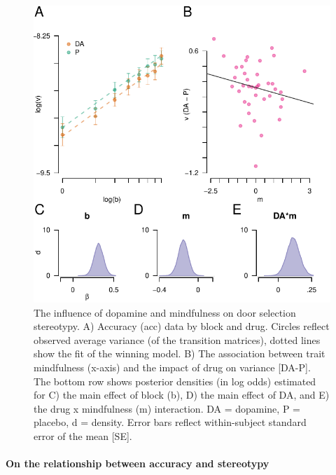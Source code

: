 \documentclass{article}
\begin{document}
\begin{figure}

{\centering \includegraphics[width=0.7\linewidth]{../../images/s_fig} 

}

\caption{The influence of dopamine and mindfulness on door selection stereotypy. A) Accuracy (acc) data by block and drug. Circles reflect observed average variance (of the transition matrices), dotted lines show the fit of the winning model. B) The association between trait mindfulness (x-axis) and the impact of drug on variance [DA-P]. The bottom row shows posterior densities (in log odds) estimated for C) the main effect of block (b), D) the main effect of DA, and E) the drug x mindfulness (m) interaction. DA = dopamine, P = placebo, d = density. Error bars reflect within-subject standard error of the mean [SE].}\label{fig:stereofig}
\end{figure}

\hypertarget{on-the-relationship-between-accuracy-and-stereotypy}{%
\paragraph{On the relationship between accuracy and
stereotypy}\label{on-the-relationship-between-accuracy-and-stereotypy}}
\end{document}
